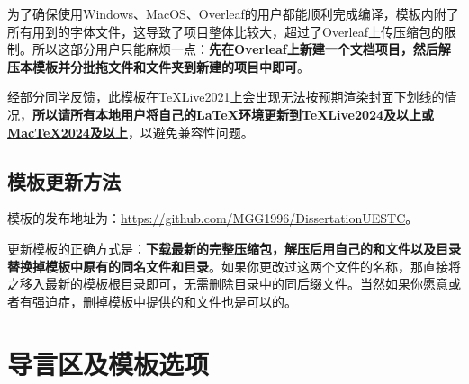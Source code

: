 \documentclass[print, doctor, vlined]{DissertUESTC}
\begin{document}
	为了确保使用Windows、MacOS、Overleaf的用户都能顺利完成编译，模板内附了所有用到的字体文件，这导致了项目整体比较大，超过了Overleaf上传压缩包的限制。所以这部分用户只能麻烦一点：\textbf{先在Overleaf上新建一个文档项目，然后解压本模板并分批拖文件和文件夹到新建的项目中即可}。

	经部分同学反馈，此模板在TeXLive2021上会出现无法按预期渲染封面下划线的情况，\textbf{所以请所有本地用户将自己的LaTeX环境更新到\href{https://mirrors.tuna.tsinghua.edu.cn/tex-historic-archive/systems/texlive/}{\color{DarkRed}TeXLive2024及以上}或\href{https://mirrors.tuna.tsinghua.edu.cn/tex-historic-archive/systems/mactex/}{\color{DarkRed}MacTeX2024及以上}}，以避免兼容性问题。

	\subsection{模板更新方法}

	模板的发布地址为：\href{https://github.com/MGG1996/DissertationUESTC}{\color{DarkRed}https://github.com/MGG1996/DissertationUESTC}。
	
	更新模板的正确方式是：\textbf{下载最新的完整压缩包，解压后用自己的和文件以及目录替换掉模板中原有的同名文件和目录}。如果你更改过这两个文件的名称，那直接将之移入最新的模板根目录即可，无需删除目录中的同后缀文件。当然如果你愿意或者有强迫症，删掉模板中提供的和文件也是可以的。
	
	\section{导言区及模板选项}
\end{document}
